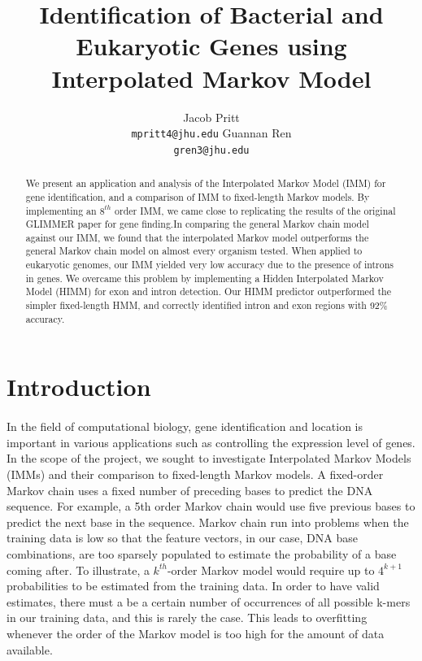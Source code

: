 \documentclass[11pt,letterpaper]{article}
\title{Identification of Bacterial and Eukaryotic Genes using Interpolated Markov Model}
\author{Jacob Pritt\\
  {\tt mpritt4@jhu.edu}
  \And
  Guannan Ren \\
  {\tt gren3@jhu.edu}}
\date{}
\begin{document}
\maketitle
\begin{abstract}
	We present an application and analysis of the Interpolated Markov Model (IMM) for gene identification, and a comparison of IMM to fixed-length Markov models. By implementing an $8^{th}$ order IMM, we came close to replicating the results of the original GLIMMER paper for gene finding.In comparing the general Markov chain model against our IMM, we found that the interpolated Markov model outperforms the general Markov chain model on almost every organism tested. When applied to eukaryotic genomes, our IMM yielded very low accuracy due to the presence of introns in genes. We overcame this problem by implementing a Hidden Interpolated Markov Model (HIMM) for exon and intron detection. Our HIMM predictor outperformed the simpler fixed-length HMM, and correctly identified intron and exon regions with 92\% accuracy.
\end{abstract}

\section{Introduction}
\paragraph{}
In the field of computational biology, gene identification and location is important in various applications such as controlling the expression level of genes. In the scope of the project, we sought to investigate Interpolated Markov Models (IMMs) and their comparison to fixed-length Markov models. A fixed-order Markov chain uses a fixed number of preceding bases to predict the DNA sequence. For example, a 5th order Markov chain would use five previous bases to predict the next base in the sequence. Markov chain run into problems when the training data is low so that the feature vectors, in our case, DNA base combinations, are too sparsely populated to estimate the probability of a base coming after. To illustrate, a $k^{th}$-order Markov model would require up to $4^{k+1}$ probabilities to be estimated from the training data. In order to have valid estimates, there must a be a certain number of occurrences of all possible k-mers in our training data, and this is rarely the case. This leads to overfitting whenever the order of the Markov model is too high for the amount of data available. 
\end{document}
